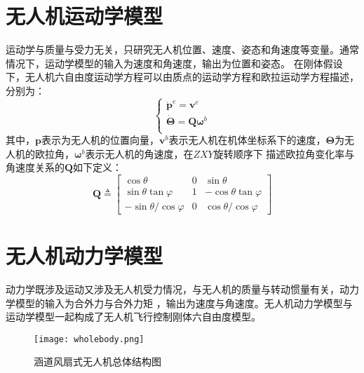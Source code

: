 \section{无人机运动学模型}
运动学与质量与受力无关，只研究无人机位置、速度、姿态和角速度等变量。通常情况下，运动学模型的输入为速度和角速度，输出为位置和姿态。
在刚体假设下，无人机六自由度运动学方程可以由质点的运动学方程和欧拉运动学方程描述，分别为：
\begin{equation}
    \left\{\begin{array}{l}
        {\dot{\mathbf{p}}}^{e}={\mathbf{v}}^{e} \\
        \dot{\mathbf{\Theta}}=\mathbf{Q} {\mathbf{\omega}}^{b} \\
        \end{array}\right.
\end{equation}
其中，$\mathbf{p}$表示为无人机的位置向量，$\mathbf{v}^{b}$表示无人机在机体坐标系下的速度，$\mathbf{\Theta}$为无人机的欧拉角，${\mathbf{\omega}}^{b}$表示无人机的角速度，在$ZXY$旋转顺序下
描述欧拉角变化率与角速度关系的$\mathbf{Q}$如下定义：
\begin{equation}
    \mathbf{Q} \triangleq\left[\begin{array}{ccc}
        \cos\theta & 0 & \sin\theta \\
        \sin\theta\tan\varphi  & 1 & -\cos\theta\tan\varphi  \\
        -\sin\theta/\cos\varphi  & 0 & \cos\theta/ \cos\varphi
        \end{array}\right]
\end{equation}
\section{无人机动力学模型}
动力学既涉及运动又涉及无人机受力情况，与无人机的质量与转动惯量有关，动力学模型的输入为合外力与合外力矩
，输出为速度与角速度。无人机动力学模型与运动学模型一起构成了无人机飞行控制刚体六自由度模型。
\begin{figure}[htbp]
    \centering
    \texttt{[image: wholebody.png]}
    \caption{\label{fig:layout}涵道风扇式无人机总体结构图}
\end{figure}

